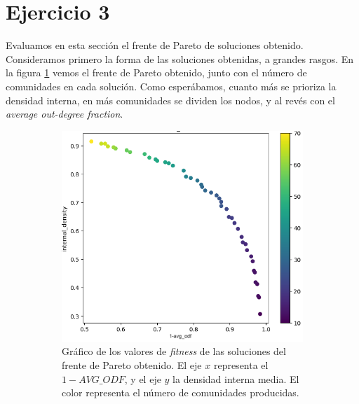 \section{Ejercicio 3}\label{sec:ej3}

Evaluamos en esta sección el frente de Pareto de soluciones obtenido.
Consideramos primero la forma de las soluciones obtenidas, a grandes rasgos. En
la figura \ref{fig:3-pareto-num-coms-1} vemos el frente de Pareto obtenido,
junto con el número de comunidades en cada solución. Como esperábamos, cuanto
más se prioriza la densidad interna, en más comunidades se dividen los nodos, y
al revés con el \emph{average out-degree fraction}.

\begin{figure}[!htb]
  \centering
  \begin{subfigure}{.48\textwidth}
    \centering
    \includegraphics[width=\linewidth]{img/3_num_communities_pareto_1}
    \caption{Gráfico de los valores de \emph{fitness} de las soluciones del
    frente de Pareto obtenido. El eje $x$ representa el \(1-AVG\_ODF\), y el
    eje \(y\) la densidad interna media. El color representa el número de
    comunidades producidas.}
    \label{fig:3-pareto-num-coms-1}
  \end{subfigure}%
  \hfill
  \begin{subfigure}{.48\textwidth}
    \centering

\end{subfigure}
\end{figure}
